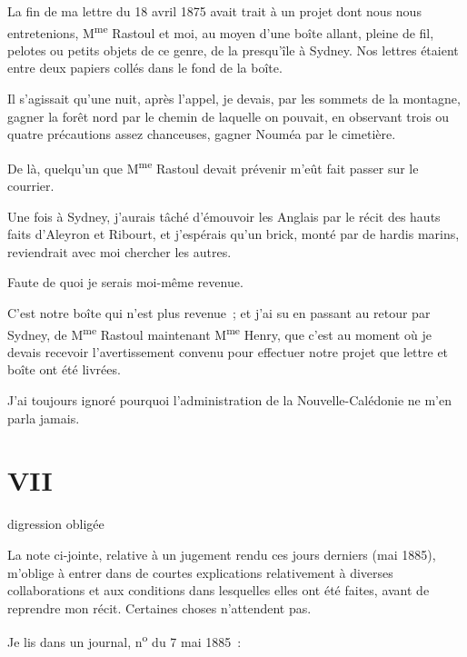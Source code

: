 \documentclass[french,twoside]{book} %
\newcommand\chapteropen{} %
\newcommand\chaptercont{} %
\newcommand\chapterclose{} %
\begin{document}
\noindent La fin de ma lettre du 18 avril 1875 avait trait à un projet dont nous nous entretenions, M\textsuperscript{me} Rastoul et moi, au moyen d’une boîte allant, pleine de fil, pelotes ou petits objets de ce genre, de la presqu’île à Sydney. Nos lettres étaient entre deux papiers collés dans le fond de la boîte.\par
Il s’agissait qu’une nuit, après l’appel, je devais, par les sommets de la montagne, gagner la forêt nord par le chemin de laquelle on pouvait, en observant trois ou quatre précautions assez chanceuses, gagner Nouméa par le cimetière.\par
 De là, quelqu’un que M\textsuperscript{me} Rastoul devait prévenir m’eût fait passer sur le courrier.\par
Une fois à Sydney, j’aurais tâché d’émouvoir les Anglais par le récit des hauts faits d’Aleyron et Ribourt, et j’espérais qu’un brick, monté par de hardis marins, reviendrait avec moi chercher les autres.\par
Faute de quoi je serais moi-même revenue.\par
C’est notre boîte qui n’est plus revenue ; et j’ai su en passant au retour par Sydney, de M\textsuperscript{me} Rastoul maintenant M\textsuperscript{me} Henry, que c’est au moment où je devais recevoir l’avertissement convenu pour effectuer notre projet que lettre et boîte ont été livrées.\par
J’ai toujours ignoré pourquoi l’administration de la Nouvelle-Calédonie ne m’en parla jamais.
\chapterclose


\chapteropen
 \chapter[{VII}]{VII}
\label{p2.7}
\begin{center}digression obligée\end{center}

\chaptercont
\noindent La note ci-jointe, relative à un jugement rendu ces jours derniers (mai 1885), m’oblige à entrer dans de courtes explications relativement à diverses collaborations et aux conditions dans lesquelles elles ont été faites, avant de reprendre mon récit. Certaines choses n’attendent pas.\par
Je lis dans un journal, n\textsuperscript{o} du 7 mai 1885 :\par
\end{document}
